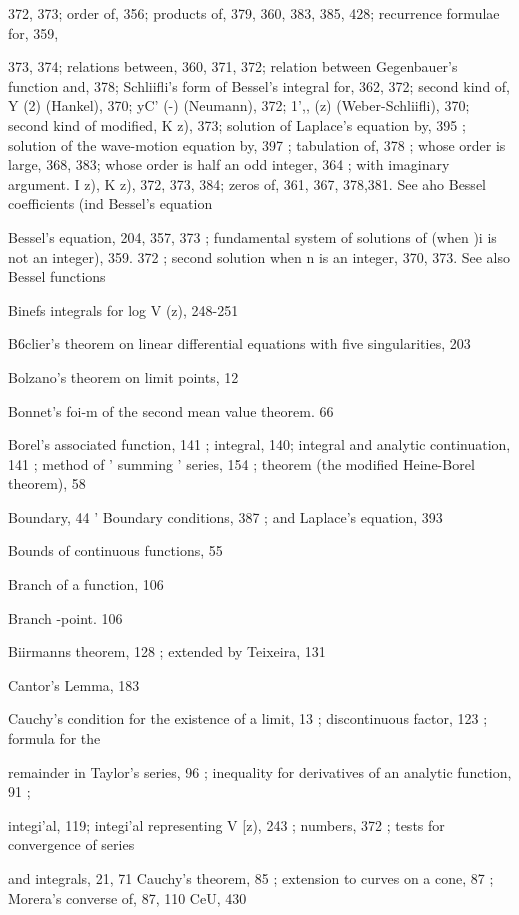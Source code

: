 372, 373; order of, 356; products of, 379, 360, 383, 385, 428; recurrence formulae for, 359,

373, 374; relations between, 360, 371, 372; relation between Gegenbauer's function and,
378; Schliifli's form of Bessel's integral for, 362, 372; second kind of, Y (2) (Hankel), 370;
yC' (-) (Neumann), 372; 1',, (z) (Weber-Schliifli), 370; second kind of modified, K  z), 373;
solution of Laplace's equation by, 395 ; solution of the wave-motion equation by, 397 ;
tabulation of, 378 ; whose order is large, 368, 383; whose order is half an odd integer, 364 ;
with imaginary argument. I  z), K  z), 372, 373, 384; zeros of, 361, 367, 378,381. See
aho Bessel coefficients (ind Bessel's equation

Bessel's equation, 204, 357, 373 ; fundamental system of solutions of (when )i is not an integer),
359. 372 ; second solution when n is an integer, 370, 373. See also Bessel functions

Binefs integrals for log V (z), 248-251

B6clier's theorem on linear differential equations with five singularities, 203

Bolzano's theorem on limit points, 12

Bonnet's foi-m of the second mean value theorem. 66

Borel's associated function, 141 ; integral, 140; integral and analytic continuation, 141 ; method
of ' summing ' series, 154 ; theorem (the modified Heine-Borel theorem), 58

Boundary, 44
 ' Boundary conditions, 387 ; and Laplace's equation, 393

Bounds of continuous functions, 55

Branch of a function, 106

Branch -point. 106

Biirmanns theorem, 128 ; extended by Teixeira, 131

Cantor's Lemma, 183

Cauchy's condition for the existence of a limit, 13 ; discontinuous factor, 123 ; formula for the

remainder in Taylor's series, 96 ; inequality for derivatives of an analytic function, 91 ;

integi'al, 119; integi'al representing V [z), 243 ; numbers, 372 ; tests for convergence of series

and integrals, 21, 71
Cauchy's theorem, 85 ; extension to curves on a cone, 87 ; Morera's converse of, 87, 110
CeU, 430

